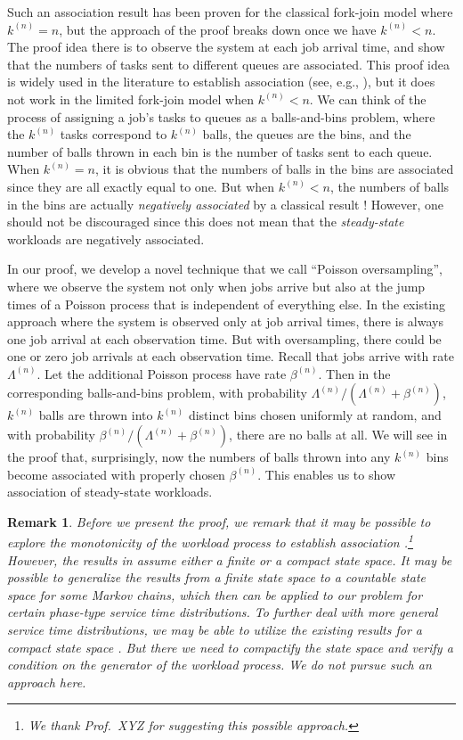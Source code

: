 \documentclass[sigconf]{acmart}
\newtheorem*{remark*}{Remark}
\newcommand{\supn}{^{(n)}}
\begin{document}
Such an association result has been proven for the classical fork-join model \cite{NelTan_88} where $k\supn = n$, but the approach of the proof breaks down once we have $k\supn < n$.  The proof idea there is to observe the system at each job arrival time, and show that the numbers of tasks sent to different queues are associated.  This proof idea is widely used in the literature to establish association (see, e.g., \cite{KumSho_93,ShaBouBac_17}), but it does not work in the limited fork-join model when $k\supn<n$.  We can think of the process of assigning a job's tasks to queues as a balls-and-bins problem, where the $k\supn$ tasks correspond to $k\supn$ balls, the queues are the bins, and the number of balls thrown in each bin is the number of tasks sent to each queue.  When $k\supn = n$, it is obvious that the numbers of balls in the bins are associated since they are all exactly equal to one.  But when $k\supn < n$, the numbers of balls in the bins are actually \emph{negatively associated} by a classical result \cite{JoaPro_83}! However, one should not be discouraged since this does not mean that the \emph{steady-state} workloads are negatively associated.


In our proof, we develop a novel technique that we call ``Poisson oversampling'', where we observe the system not only when jobs arrive but also at the jump times of a Poisson process that is independent of everything else.  In the existing approach where the system is observed only at job arrival times, there is always one job arrival at each observation time.  But with oversampling, there could be one or zero job arrivals at each observation time.  Recall that jobs arrive with rate $\Lambda\supn$.  Let the additional Poisson process have rate $\beta\supn$.  Then in the corresponding balls-and-bins problem, with probability $\Lambda\supn/(\Lambda\supn+\beta\supn)$, $k\supn$ balls are thrown into $k\supn$ distinct bins chosen uniformly at random, and with probability $\beta\supn/(\Lambda\supn+\beta\supn)$, there are no balls at all.  We will see in the proof that, surprisingly, now the numbers of balls thrown into any $k\supn$ bins become associated with properly chosen $\beta\supn$.  This enables us to show association of steady-state workloads.


\begin{remark*}
Before we present the proof, we remark that it may be possible to explore the monotonicity of the workload process to establish association \cite{Har_77,Cox_84,Lig_05}.\footnote{We thank Prof.\ XYZ for suggesting this possible approach.}  However, the results in \cite{Har_77,Cox_84,Lig_05} assume either a finite or a compact state space.  It may be possible to generalize the results from a finite state space \cite{Har_77,Cox_84} to a countable state space for some Markov chains, which then can be applied to our problem for certain phase-type service time distributions.  To further deal with more general service time distributions, we may be able to utilize the existing results for a compact state space \cite{Lig_05}.  But there we need to compactify the state space and verify a condition on the generator of the workload process.  We do not pursue such an approach here.
\end{remark*}
\end{document}
